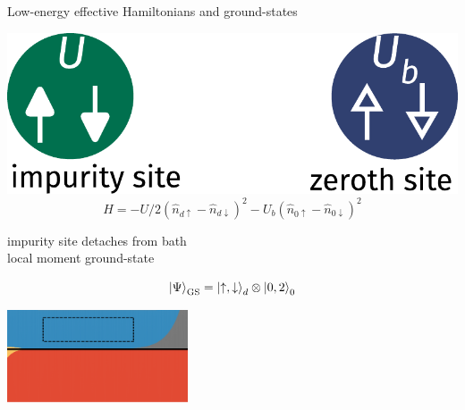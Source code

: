 \documentclass[9pt,aspectratio=169]{beamer}
\begin{document}
\begin{frame}{Low-energy effective Hamiltonians and ground-states}
{{\begin{minipage}{0.4\textwidth}
\includegraphics[width=\textwidth]{local-moment.pdf}
\[H = - U/2\left( \hat n_{d \uparrow} - \hat n_{d \downarrow} \right)^2 - U_b\left( \hat n_{0 \uparrow} - \hat n_{0 \downarrow} \right)^2\]
\end{minipage}
\hspace*{\fill}
\begin{minipage}{0.45\textwidth}
\vspace*{\fill}
\begin{enumerate}
\nitem impurity site detaches from bath\\[6pt]
\nitem \alert{local moment} ground-state\\[10pt]
\end{enumerate}
\[\ket{\Psi}_\text{GS} = \ket{\uparrow,\downarrow}_d\otimes\ket{0,2}_0 \]
\end{minipage}
}

\vspace*{\fill}

\includegraphics[width=0.4\textwidth]{phase-map-MIT3.pdf}
}

\end{frame}
\end{document}
